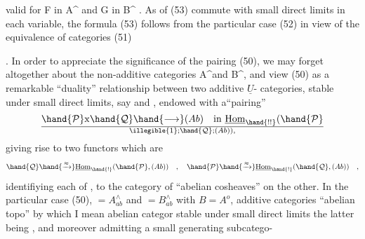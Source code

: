 
valid for  F in A\^{} and G in B\^{} .  As   of (53) commute
with small direct limits in each variable,   the formula (53) follows
from the particular case (52)\hand{,} in view of the equivalence of categories (51)

\hand{\uline{\textcolor{black}{Remarks}}}.  In order to appreciate the significance of the pairing (50),
we may forget altogether about the non-additive categories A\^{}and B\^{},  and
view (50) as a remarkable ``duality'' relationship between two additive $\underline{U}$-%
categories,  stable under small direct limits,  say  and ,  endowed
with a``pairing''
\[ \hand{\mathcal{P}}\mathrm{x}\hand{\mathcal{Q}} \hand{\longrightarrow} (Ab) \quad \text{in } \underline{\mathrm{Hom}}_{\hand{!!}}(\hand{\mathcal{P}}\over{\illegible{1}}{;}\hand{\mathcal{Q}}; (Ab)) , \]
giving rise to two functors which are \hand{\uline{\textcolor{black}{equivalences}}}
\[ \hand{\mathcal{Q}}\hand{\xrightarrow{\approx}}\underline{\mathrm{Hom}}_{\hand{!}}(\hand{\mathcal{P}}, (Ab)) \quad , \quad \hand{\mathcal{P}}\hand{\xrightarrow{\approx}}\underline{\mathrm{Hom}}_{\hand{!}}(\hand{\mathcal{Q}}, (Ab)) \quad , \]
identifiying each of ,  to the category of ``abelian cosheaves'' on the
other.  In the particular case (50),   $= A^{\wedge}_{ab}$  and  $= B^{\wedge}_{ab}$  with $B=A^{o}$,
  additive categories   ``abelian topo'' by which I mean 
  abelian categor  stable under small  direct limits\hand{,}   the
latter being \hand{\uline{\textcolor{black}{exact}}} ,  and moreover  admitting a small generating subcatego-%
